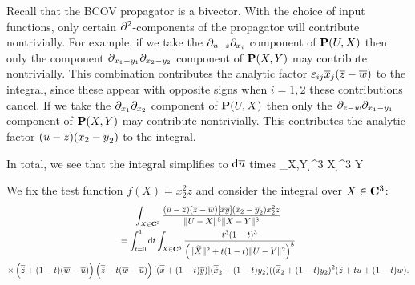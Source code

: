 \documentclass[../main.tex]{subfiles}
\begin{document}
Recall that the BCOV propagator is a bivector.
With the choice of input functions, only certain $\partial^2$-components of the propagator will contribute nontrivially.
For example, if we take the $\partial_{u-z} \partial_{x_i}$ component of $\mathbf{P}(U,X)$ then only the component $\partial_{x_1 - y_1} \partial_{x_2-y_2}$ component of $\mathbf{P}(X,Y)$ may contribute nontrivially.
This combination contributes the analytic factor $\varepsilon_{ij} \overline x_j (\overline z - \overline w)$ to the integral, since these appear with opposite signs when $i=1,2$ these contributions cancel.
If we take the $\partial_{x_1} \partial_{x_2}$ component of $\mathbf{P}(U,X)$ then only the $\partial_{z-w} \partial_{x_1-y_1}$ component of $\mathbf{P}(X,Y)$ may contribute nontrivially.
This contributes the analytic factor $(\overline u - \overline z) (\overline x_2 - \overline y_2)$ to the integral.

In total, we see that the integral simplifies to $\mathrm{d} \overline u$ times 
\beqn
\int_{X,Y}  \d^3 X \d^3 Y
\eeqn

We fix the test function $f(X) = x_2^2 z$ and consider the integral over $X\in \mathbf{C}^3$:
\begin{multline}
\int_{X \in \mathbf{C}^3} \frac{(\overline u - \overline z) (\overline z - \overline w) [\overline x \overline y] (\overline x_2 - \overline y_2) x_2^2 z}{\|U - X\|^8 \|X-Y\|^8} \\= \int_{t=0}^1 \mathrm{d} t \int_{X \in \mathbf{C}^3} \frac{t^3 (1-t)^3}{\left(\|\widetilde X\|^2 + t(1-t) \|U - Y\|^2\right)^8} \\ \times \left(\overline {\widetilde z} + (1-t)(\overline w-\overline u)\right) \left(\overline {\widetilde z} - t(\overline w-\overline u)\right) [(\overline{\widetilde x} + (1-t) \overline y)] (\overline {\widetilde x}_2 + (1-t)y_2) ((\overline {\widetilde x}_2 + (1-t)y_2)^2 (\widetilde z + t u + (1-t) w).
\end{multline}

\newpage
\end{document}

